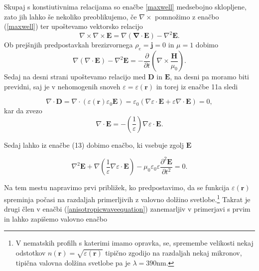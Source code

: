\documentclass[longbibliography,slovene,a4paper,12pt]{book}
\begin{document}
Skupaj s konstiutivnima relacijama so enačbe \ref{maxwell} medsebojno sklopljene, zato jih lahko še nekoliko preoblikujemo, če  $\nabla \times$ pomnožimo z enačbo (\ref{maxwell}) ter upoštevamo vektorsko relacijo
\begin{equation}
\nabla \times \nabla \times \mathbf{E} = \nabla(\mathbf{\nabla} \cdot \mathbf{E}) - \nabla^2 \mathbf{E}.
\end{equation}
Ob prejšnjih predpostavkah brezizvornega $\rho_e = \mathbf{j} = 0$ in $\mu = 1$ dobimo
\begin{equation}
\nabla(\nabla \cdot \mathbf{E})  - \nabla^2 \mathbf{E} = - \frac{\partial}{\partial t} \left (\nabla \times \frac{\mathbf{H}}{\mu_0} \right ).
 \end{equation} 
Sedaj na desni strani upoštevamo relacijo med $\mathbf{D}$ in $\mathbf{E}$, na desni pa moramo biti previdni, saj je v nehomogenih snoveh $\varepsilon = \varepsilon(\mathbf{r})$ in torej iz enačbe 11a sledi
 
 \begin{equation}
 \nabla \cdot \mathbf{D} = \nabla \cdot (\varepsilon(\mathbf{r}) \varepsilon_0 \mathbf{E}) = \varepsilon_0 \left ( \nabla \varepsilon \cdot \mathbf{E}  + \varepsilon \nabla \cdot \mathbf{E} \right ) = 0,
 \end{equation}
 kar da zvezo 
 \begin{equation}
 \nabla \cdot \mathbf{E} = -\left (\frac{1}{\varepsilon} \right ) \nabla \varepsilon \cdot \mathbf{E}.
 \end{equation}
 
 Sedaj lahko iz enačbe (13) dobimo enačbo, ki vsebuje zgolj $\mathbf{E}$
 
 \begin{equation}
 \nabla^2 \mathbf{E} + \nabla \left(\frac{1}{\varepsilon} \nabla \varepsilon \cdot \mathbf{E}\right) - \mu_0 \varepsilon_0 \varepsilon \frac{\partial^2\mathbf{E}}{\partial t^2} = 0.
 \label{anisotropicwaveequation}
 \end{equation}
 
 Na tem mestu napravimo prvi približek, ko predpostavimo, da se funkcija $\varepsilon(\mathbf{r})$ spreminja počasi na razdaljah primerljivih z valovno dolžino svetlobe.\footnote{V nematskih profilh s katerimi imamo opravka, se, spremembe velikosti nekaj odstotkov $n(\mathbf{r}) = \sqrt{\varepsilon(\mathbf{r})}$ tipično zgodijo na razdaljah nekaj mikronov, tipična  valovna dolžina svetlobe pa je $\lambda = 390$nm.} Takrat je drugi člen v enačbi (\ref{anisotropicwaveequation}) zanemarljiv v primerjavi s prvim in lahko zapišemo valovno enačbo
 
\end{document}
